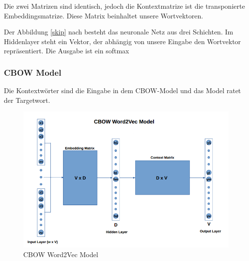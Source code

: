 Die zwei Matrizen sind identisch, jedoch die Kontextmatrize ist die transponierte Embeddingsmatrize. Diese Matrix beinhaltet unsere Wortvektoren.

Der Abbildung \ref{skip} nach besteht das neuronale Netz aus drei Schichten. Im Hiddenlayer steht ein Vektor, der abhängig von unsere Eingabe den Wortvektor repräsentiert. Die Ausgabe ist ein softmax


\subsubsection{CBOW Model}
Die Kontextwörter sind die Eingabe in dem CBOW-Model und das Model ratet der Targetwort.

\begin{figure}
	\centering
	\includegraphics[scale=0.5]{images/CBOW_Model.png}
	\caption{CBOW Word2Vec Model}
	\label{cbow}
\end{figure}
